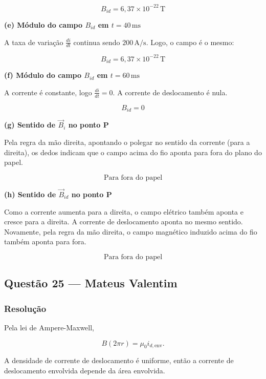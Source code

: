 \documentclass[12pt,a4paper]{article}
\begin{document}
\[
\boxed{B_{id} = 6,37 \times 10^{-22}\,\text{T}}
\]

\textbf{(e) Módulo do campo \(B_{id}\) em \(t = 40\,\text{ms}\)}

A taxa de variação \(\frac{di}{dt}\) continua sendo \(200\,\text{A/s}\). Logo, o campo é o mesmo:

\[
\boxed{B_{id} = 6,37 \times 10^{-22}\,\text{T}}
\]

\textbf{(f) Módulo do campo \(B_{id}\) em \(t = 60\,\text{ms}\)}

A corrente é constante, logo \(\frac{di}{dt} = 0\). A corrente de deslocamento é nula.

\[
\boxed{B_{id} = 0}
\]

\textbf{(g) Sentido de \(\vec{B}_i\) no ponto P}

Pela regra da mão direita, apontando o polegar no sentido da corrente (para a direita), os dedos indicam que o campo acima do fio aponta para fora do plano do papel.

\[
\boxed{\text{Para fora do papel}}
\]

\textbf{(h) Sentido de \(\vec{B}_{id}\) no ponto P}

Como a corrente aumenta para a direita, o campo elétrico também aponta e cresce para a direita. A corrente de deslocamento aponta no mesmo sentido. Novamente, pela regra da mão direita, o campo magnético induzido acima do fio também aponta para fora.

\[
\boxed{\text{Para fora do papel}}
\]

\subsection{Questão 25 — Mateus Valentim}


\subsubsection{Resolução}

Pela lei de Ampere-Maxwell,

\[
B(2\pi r)=\mu_0 i_{d,\text{env}}.
\]

A densidade de corrente de deslocamento é uniforme, então a corrente de
deslocamento envolvida depende da área envolvida.
\end{document}
